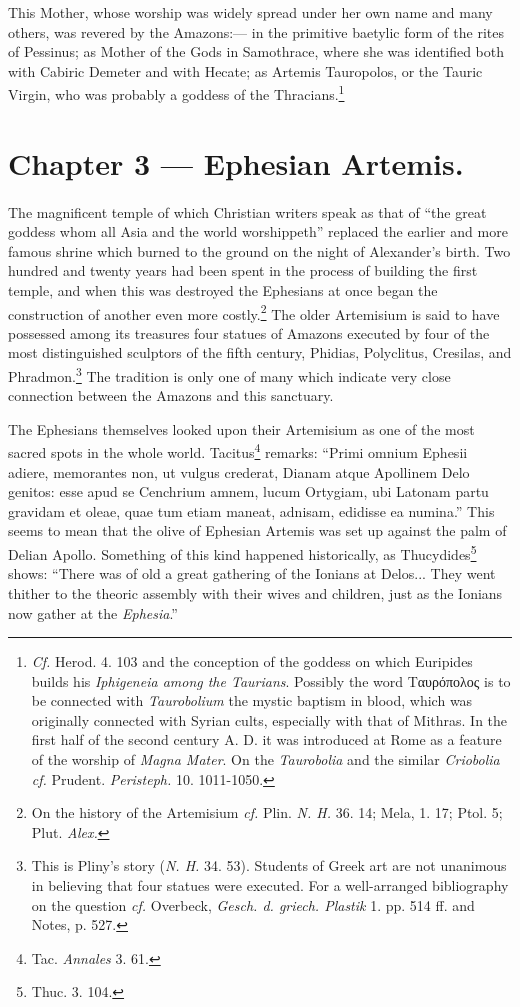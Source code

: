 \documentclass[a4paper, 12pt, oneside]{article}
\begin{document}
This Mother, whose worship was widely spread under her own name and many others, was revered by the Amazons:--- in the primitive baetylic form of the rites of Pessinus; as Mother of the Gods in Samothrace, where she was identified both with Cabiric Demeter and with Hecate; as Artemis Tauropolos, or the Tauric Virgin, who was probably a goddess of the Thracians.\footnote{\emph{Cf.} Herod. 4. 103 and the conception of the goddess on which Euripides builds his \emph{Iphigeneia among the Taurians}. Possibly the word Ταυρόπολος is to be connected with \emph{Taurobolium} the mystic baptism in blood, which was originally connected with Syrian cults, especially with that of Mithras. In the first half of the second century A. D. it was introduced at Rome as a feature of the worship of \emph{Magna Mater}. On the \emph{Taurobolia} and the similar \emph{Criobolia} \emph{cf.} Prudent. \emph{Peristeph.} 10. 1011-1050.}
\clearpage
\section{Chapter 3 --- Ephesian Artemis.}
\paragraph{}
The magnificent temple of which Christian writers speak as that of ``the great goddess whom all Asia and the world worshippeth'' replaced the earlier and more famous shrine which burned to the ground on the night of Alexander's birth. Two hundred and twenty years had been spent in the process of building the first temple, and when this was destroyed the Ephesians at once began the construction of another even more costly.\footnote{On the history of the Artemisium \emph{cf.} Plin. \emph{N. H.} 36. 14; Mela, 1. 17; Ptol. 5; Plut. \emph{Alex.}} The older Artemisium is said to have possessed among its treasures four statues of Amazons executed by four of the most distinguished sculptors of the fifth century, Phidias, Polyclitus, Cresilas, and Phradmon.\footnote{This is Pliny's story (\emph{N. H.} 34. 53). Students of Greek art are not unanimous in believing that four statues were executed. For a well-arranged bibliography on the question \emph{cf.} Overbeck, \emph{Gesch. d. griech. Plastik} 1. pp. 514 ff. and Notes, p. 527.} The tradition is only one of many which indicate very close connection between the Amazons and this sanctuary.

The Ephesians themselves looked upon their Artemisium as one of the most sacred spots in the whole world. Tacitus\footnote{Tac. \emph{Annales} 3. 61.} remarks: ``Primi omnium Ephesii adiere, memorantes non, ut vulgus crederat, Dianam atque Apollinem Delo genitos: esse apud se Cenchrium amnem, lucum Ortygiam, ubi Latonam partu gravidam et oleae, quae tum etiam maneat, adnisam, edidisse ea numina.'' This seems to mean that the olive of Ephesian Artemis was set up against the palm of Delian Apollo. Something of this kind happened historically, as Thucydides\footnote{Thuc. 3. 104.} shows: ``There was of old a great gathering of the Ionians at Delos... They went thither to the theoric assembly with their wives and children, just as the Ionians now gather at the \emph{Ephesia}.''
\end{document}

